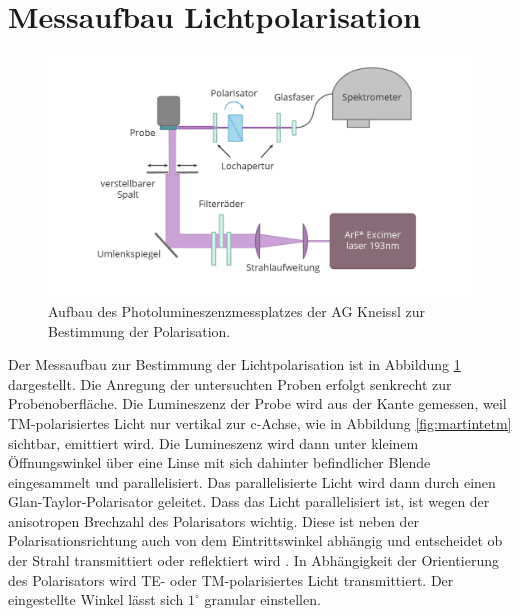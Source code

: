 \section{Messaufbau Lichtpolarisation}
\begin{figure}[!htb]
    \centering
    \begin{minipage}[t]{\linewidth}
        \centering
        \includegraphics[width=0.8\linewidth]{Bilder/aufbauPol.png}
        \caption{Aufbau des Photolumineszenzmessplatzes der AG Kneissl zur Bestimmung der Polarisation. }
        \label{fig:polaufbau}
    \end{minipage}%
\end{figure}
\vspace{1cm}
\noindent
Der Messaufbau zur Bestimmung der Lichtpolarisation ist in Abbildung \ref{fig:polaufbau} dargestellt.
Die Anregung der untersuchten Proben erfolgt senkrecht zur Probenoberfläche. Die Lumineszenz der Probe wird aus der Kante gemessen, weil TM-polarisiertes Licht nur vertikal zur c-Achse, wie in Abbildung \ref{fig:martintetm} sichtbar, emittiert wird. Die Lumineszenz wird dann unter kleinem Öffnungswinkel über eine Linse mit sich dahinter befindlicher Blende eingesammelt und parallelisiert. Das parallelisierte Licht wird dann durch einen Glan-Taylor-Polarisator geleitet. Dass das Licht parallelisiert ist, ist wegen der anisotropen Brechzahl des Polarisators wichtig. Diese ist neben der Polarisationsrichtung auch von dem Eintrittswinkel abhängig und entscheidet ob der Strahl transmittiert oder reflektiert wird \cite{0950-7671-25-12-304}. In Abhängigkeit der Orientierung des Polarisators wird TE- oder TM-polarisiertes Licht transmittiert. Der eingestellte Winkel lässt sich $1^\circ$ granular einstellen. 
